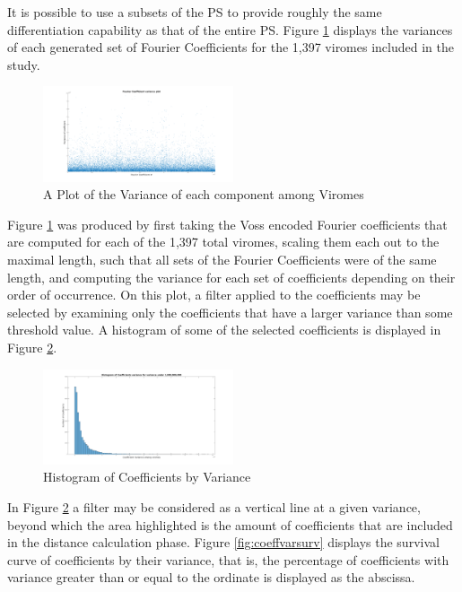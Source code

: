 It is possible to use a subsets of the PS to provide roughly the same differentiation capability as that of the entire PS. 
Figure \ref{fig:coeffvar} displays the variances of each generated set of Fourier Coefficients for the 1,397 viromes included in the study.  

\begin{figure}[h!] 
\includegraphics[width=0.5\textwidth]{Images/Files/FCoeff_var.png} 
\caption{A Plot of the Variance of each component among Viromes\label{fig:coeffvar}} 
\end{figure} 

Figure \ref{fig:coeffvar} was produced by first taking the Voss encoded Fourier coefficients that are 
computed for each of the 1,397 total viromes, scaling them each out to the maximal length, such that all 
sets of the Fourier Coefficients were of the same length, and computing the variance for each set of 
coefficients depending on their order of occurrence. On this plot, a filter applied to the coefficients may 
be selected by examining only the coefficients that have a larger variance than some threshold value. 
A histogram of some of the selected coefficients is displayed in Figure \ref{fig:coeffvarhist}. 

\begin{figure}[h!]
\includegraphics[width=0.5\textwidth]{Images/Files/FCoeff_var_hist.png}
\caption{Histogram of Coefficients by Variance\label{fig:coeffvarhist}}
\end{figure} 

In Figure \ref{fig:coeffvarhist} a filter may be considered as a vertical line at a given variance, beyond which the area
highlighted is the amount of coefficients that are included in the distance calculation phase.  Figure 
\ref{fig:coeffvarsurv} displays the survival curve of coefficients by their variance, that is, the
percentage of coefficients with variance greater than or equal to the ordinate is displayed as the 
abscissa. 

